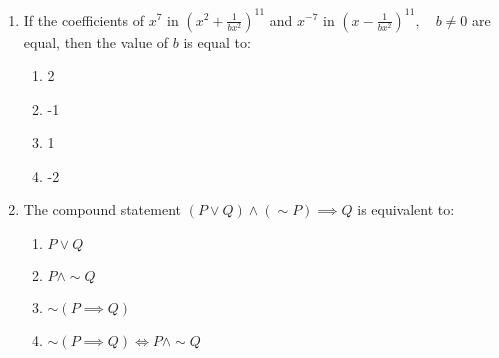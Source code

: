 \documentclass[journal]{IEEEtran}
\numberwithin{figure}{enumi}
\begin{document}
\begin{enumerate}
\item
If the coefficients of $ x^7 $ in $\left( x^2 + \frac{1}{bx^2} \right)^{11}$ and $ x^{-7} $ in  $\left( x - \frac{1}{bx^2} \right)^{11}, \quad b \neq 0$
are equal, then the value of $ b $ is equal to:
\begin{enumerate}
    \item 2
    \item -1
    \item 1
    \item -2
\end{enumerate}
\item The compound statement $(P\vee Q)\wedge(\sim P)\implies Q$ is equivalent to:
\begin{enumerate}
    \item $P\vee Q$
    \item $P \wedge \sim Q$
    \item $\sim (P \implies Q)$
    \item $\sim (P\implies Q)\Leftrightarrow P \wedge \sim Q$
\end{enumerate}
 

\end{enumerate}
\end{document}

